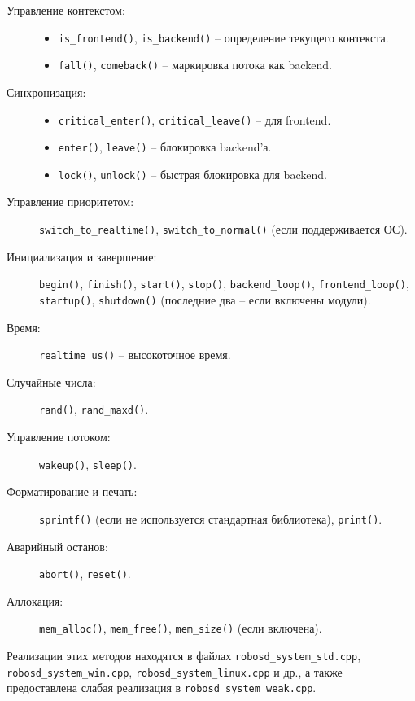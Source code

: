 \documentclass[a4paper,12pt]{article}
\begin{document}
\begin{description}
    \item[Управление контекстом:]
        \begin{itemize}
            \item \texttt{is\_frontend()}, \texttt{is\_backend()} -- определение текущего контекста.
            \item \texttt{fall()}, \texttt{comeback()} -- маркировка потока как backend.
        \end{itemize}
    \item[Синхронизация:]
        \begin{itemize}
            \item \texttt{critical\_enter()}, \texttt{critical\_leave()} -- для frontend.
            \item \texttt{enter()}, \texttt{leave()} -- блокировка backend'а.
            \item \texttt{lock()}, \texttt{unlock()} -- быстрая блокировка для backend.
        \end{itemize}
    \item[Управление приоритетом:] \texttt{switch\_to\_realtime()}, \texttt{switch\_to\_normal()} (если поддерживается ОС).
    \item[Инициализация и завершение:] \texttt{begin()}, \texttt{finish()}, \texttt{start()}, \texttt{stop()}, \texttt{backend\_loop()}, \texttt{frontend\_loop()}, \texttt{startup()}, \texttt{shutdown()} (последние два -- если включены модули).
    \item[Время:] \texttt{realtime\_us()} -- высокоточное время.
    \item[Случайные числа:] \texttt{rand()}, \texttt{rand\_maxd()}.
    \item[Управление потоком:] \texttt{wakeup()}, \texttt{sleep()}.
    \item[Форматирование и печать:] \texttt{sprintf()} (если не используется стандартная библиотека), \texttt{print()}.
    \item[Аварийный останов:] \texttt{abort()}, \texttt{reset()}.
    \item[Аллокация:] \texttt{mem\_alloc()}, \texttt{mem\_free()}, \texttt{mem\_size()} (если включена).
\end{description}

Реализации этих методов находятся в файлах \texttt{robosd\_system\_std.cpp}, \texttt{robosd\_system\_win.cpp}, \texttt{robosd\_system\_linux.cpp} и др., а также предоставлена слабая реализация в \texttt{robosd\_system\_weak.cpp}.
\end{document}
